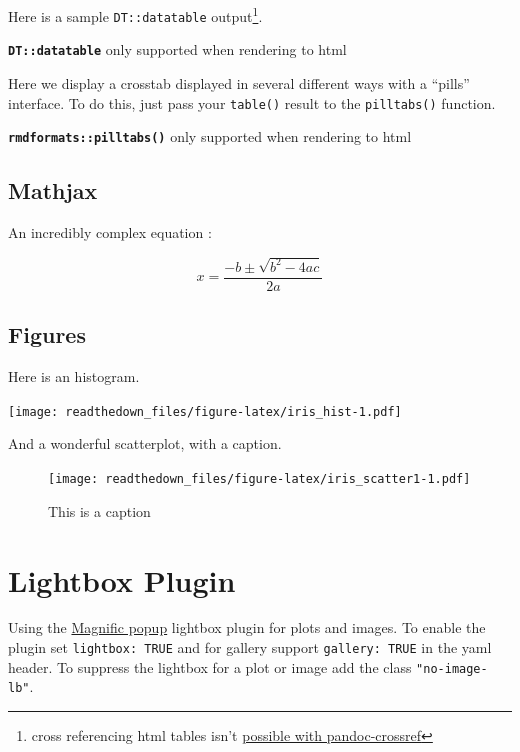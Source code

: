 \documentclass[
]{article}
\begin{document}
Here is a sample \texttt{DT::datatable} output\footnote{cross
  referencing html tables isn't
  \href{https://github.com/lierdakil/pandoc-crossref/issues/122}{possible
  with pandoc-crossref}}.

\textbf{\texttt{DT::datatable}} only supported when rendering to html

Here we display a crosstab displayed in several different ways with a
``pills'' interface. To do this, just pass your \texttt{table()} result
to the \texttt{pilltabs()} function.

\textbf{\texttt{rmdformats::pilltabs()}} only supported when rendering
to html

\hypertarget{mathjax}{%
\subsection{Mathjax}\label{mathjax}}

An incredibly complex equation :

\protect\hypertarget{eq:quadratic_formula}{}{\begin{equation}x = \frac{-b \pm \sqrt{b^2-4ac}}{2a}\label{eq:quadratic_formula}\end{equation}}

\hypertarget{figures}{%
\subsection{Figures}\label{figures}}

Here is an histogram.

\texttt{[image: readthedown\_files/figure-latex/iris\_hist-1.pdf]}

And a wonderful scatterplot, with a caption.

\begin{figure}
\hypertarget{fig:iris_scatter1}{%
\centering
\texttt{[image: readthedown\_files/figure-latex/iris\_scatter1-1.pdf]}
\caption{This is a caption}\label{fig:iris_scatter1}
}
\end{figure}

\hypertarget{sec:lb-support}{%
\section{Lightbox Plugin}\label{sec:lb-support}}

Using the \href{http://dimsemenov.com/plugins/magnific-popup/}{Magnific
popup} lightbox plugin for plots and images. To enable the plugin set
\texttt{lightbox:\ TRUE} and for gallery support \texttt{gallery:\ TRUE}
in the yaml header. To suppress the lightbox for a plot or image add the
class \texttt{"no-image-lb"}.
\end{document}
